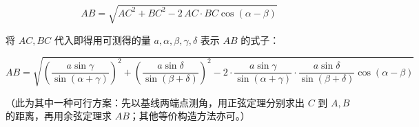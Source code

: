 \begin{answer}
\nopagebreak[4]
\[
AB=\sqrt{AC^2+BC^2-2\,AC\cdot BC\cos(\alpha-\beta)}
\]

将 $AC,BC$ 代入即得用可测得的量 $a,\alpha,\beta,\gamma,\delta$ 表示 $AB$ 的式子：

\nopagebreak[4]
\[
AB=\sqrt{\left(\frac{a\sin\gamma}{\sin(\alpha+\gamma)}\right)^2+\left(\frac{a\sin\delta}{\sin(\beta+\delta)}\right)^2-2\cdot\frac{a\sin\gamma}{\sin(\alpha+\gamma)}\cdot\frac{a\sin\delta}{\sin(\beta+\delta)}\cos(\alpha-\beta)}
\]

（此为其中一种可行方案：先以基线两端点测角，用正弦定理分别求出 $C$ 到 $A,B$ 的距离，再用余弦定理求 $AB$；其他等价构造方法亦可。）


\end{answer}
